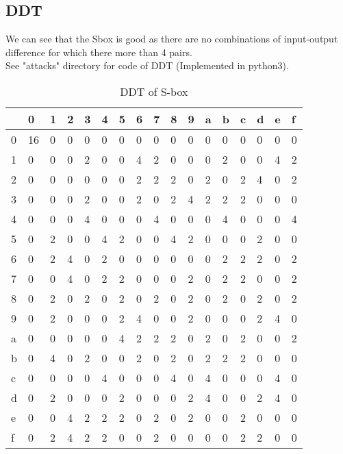 \documentclass[final]{transcrypto}
\begin{document}
\subsection{DDT}
We can see that the Sbox is good as there are no combinations of input-output difference for which there more than 4 pairs.\\
See "attacks" directory for code of DDT (Implemented in python3).
\begin{table}[H]
	\centering
	\caption{DDT of S-box}
	\begin{tabular}{|l||l|l|l|l|l|l|l|l|l|l|l|l|l|l|l|l|}
		\hline
 &  0&	1&	2&	3&	4&	5&	6&	7&	8&	9&	a&	b&	c&	d&	e&	f\\ \hline
 \hline
0& 16 & 0 & 0 & 0 & 0 & 0 & 0 & 0 & 0 & 0 & 0 & 0 & 0 & 0 & 0 & 0 \\ \hline
1& 0 & 0 & 0 & 2 & 0 & 0 & 4 & 2 & 0 & 0 & 0 & 2 & 0 & 0 & 4 & 2 \\ \hline
2& 0 & 0 & 0 & 0 & 0 & 0 & 2 & 2 & 2 & 0 & 2 & 0 & 2 & 4 & 0 & 2 \\ \hline
3& 0 & 0 & 0 & 2 & 0 & 0 & 2 & 0 & 2 & 4 & 2 & 2 & 2 & 0 & 0 & 0  \\ \hline 
4& 0 & 0 & 0 & 4 & 0 & 0 & 0 & 4 & 0 & 0 & 0 & 4 & 0 & 0 & 0 & 4  \\ \hline
5& 0 & 2 & 0 & 0 & 4 & 2 & 0 & 0 & 4 & 2 & 0 & 0 & 0 & 2 & 0 & 0  \\ \hline
6& 0 & 2 & 4 & 0 & 2 & 0 & 0 & 0 & 0 & 0 & 0 & 2 & 2 & 2 & 0 & 2  \\ \hline
7& 0 & 0 & 4 & 0 & 2 & 2 & 0 & 0 & 0 & 2 & 0 & 2 & 2 & 0 & 0 & 2  \\ \hline
8& 0 & 2 & 0 & 2 & 0 & 2 & 0 & 2 & 0 & 2 & 0 & 2 & 0 & 2 & 0 & 2  \\ \hline
9& 0 & 2 & 0 & 0 & 0 & 2 & 4 & 0 & 0 & 2 & 0 & 0 & 0 & 2 & 4 & 0  \\ \hline
a& 0 & 0 & 0 & 0 & 0 & 4 & 2 & 2 & 2 & 0 & 2 & 0 & 2 & 0 & 0 & 2  \\ \hline
b& 0 & 4 & 0 & 2 & 0 & 0 & 2 & 0 & 2 & 0 & 2 & 2 & 2 & 0 & 0 & 0  \\ \hline
c& 0 & 0 & 0 & 0 & 4 & 0 & 0 & 0 & 4 & 0 & 4 & 0 & 0 & 0 & 4 & 0  \\ \hline
d& 0 & 2 & 0 & 0 & 0 & 2 & 0 & 0 & 0 & 2 & 4 & 0 & 0 & 2 & 4 & 0  \\ \hline
e& 0 & 0 & 4 & 2 & 2 & 2 & 0 & 2 & 0 & 2 & 0 & 0 & 2 & 0 & 0 & 0  \\ \hline
f& 0 & 2 & 4 & 2 & 2 & 0 & 0 & 2 & 0 & 0 & 0 & 0 & 2 & 2 & 0 & 0 \\ \hline
	\end{tabular}
\end{table}
\end{document}
